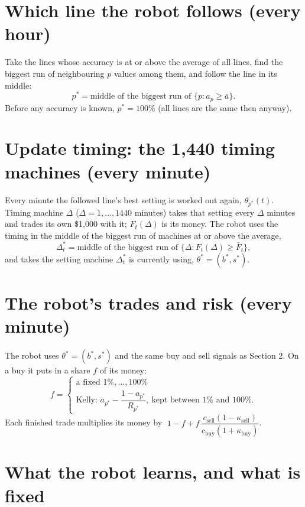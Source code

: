 \documentclass[11pt]{article}
\begin{document}
\section{Which line the robot follows (every hour)}

Take the lines whose accuracy is at or above the average of all lines, find the biggest run of
neighbouring $p$ values among them, and follow the line in its middle:
\[
p^* = \text{middle of the biggest run of } \{p : a_p \ge \bar a\} .
\]
Before any accuracy is known, $p^* = 100\%$ (all lines are the same then anyway).

\section{Update timing: the 1,440 timing machines (every minute)}

Every minute the followed line's best setting is worked out again, $\theta_{p^*}(t)$. Timing machine
$\Delta$ ($\Delta = 1, \dots, 1440$ minutes) takes that setting every $\Delta$ minutes and trades its own
\$1{,}000 with it; $F_t(\Delta)$ is its money. The robot uses the timing in the middle of the biggest
run of machines at or above the average,
\[
\Delta^*_t = \text{middle of the biggest run of } \{\Delta : F_t(\Delta) \ge \bar F_t\},
\]
and takes the setting machine $\Delta^*_t$ is currently using, $\theta^* = (b^*, s^*)$.

\section{The robot's trades and risk (every minute)}

The robot uses $\theta^* = (b^*, s^*)$ and the same buy and sell signals as Section 2. On a buy it puts in a share $f$ of its money:
\[
f = \begin{cases} \text{a fixed } 1\%,\dots,100\% \\[2pt]
\text{Kelly: } a_{p^*} - \dfrac{1-a_{p^*}}{R_{p^*}}, \ \text{kept between } 1\% \text{ and } 100\%. \end{cases}
\]
Each finished trade multiplies its money by
$\;1 - f + f\,\dfrac{c_{\text{sell}}(1-\kappa_{\text{sell}})}{c_{\text{buy}}(1+\kappa_{\text{buy}})}$.

\section{What the robot learns, and what is fixed}
\end{document}

